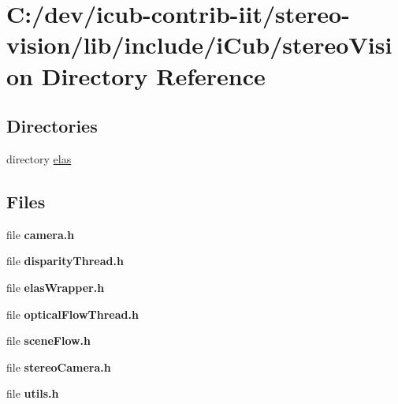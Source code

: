 \section{C\+:/dev/icub-\/contrib-\/iit/stereo-\/vision/lib/include/i\+Cub/stereo\+Vision Directory Reference}
\label{dir_50bad1a883b2386a62f50ea4f4f2f861}
\subsection*{Directories}
\begin{DoxyCompactItemize}
\item 
directory \hyperlink{dir_f53e440ea5bef4714dd0a15d20f80d76}{elas}
\end{DoxyCompactItemize}
\subsection*{Files}
\begin{DoxyCompactItemize}
\item 
file {\bfseries camera.\+h}
\item 
file {\bfseries disparity\+Thread.\+h}
\item 
file {\bfseries elas\+Wrapper.\+h}
\item 
file {\bfseries optical\+Flow\+Thread.\+h}
\item 
file {\bfseries scene\+Flow.\+h}
\item 
file {\bfseries stereo\+Camera.\+h}
\item 
file {\bfseries utils.\+h}
\end{DoxyCompactItemize}
